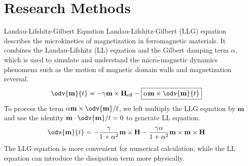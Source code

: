 \documentclass [ svgnames,aspectratio = 2013, handout ] {beamer}
\begin{document}
\maketitle

\section{Research Methods}

\begin{frame}{Landau-Lifshitz-Gilbert Equation}
  \pause
  Landau-Lifshitz-Gilbert (LLG) equation describes the microkinetics of magnetization in ferromagnetic materials. It combines the Landau-Lifshitz (LL) equation and the Gilbert damping term $\alpha$, which is used to simulate and understand the micro-magnetic dynamics phenomena such as the motion of magnetic domain walls and magnetization reversal.
  \pause
  \begin{equation}
    \odv{\mathbf m}{t} = -\gamma \mathbf m \times \mathbf H_\text{eff} -
    \boxed{\alpha \mathbf m \times \odv{\mathbf m}{t}}
  \end{equation}
  \pause
  To process the term $\alpha \mathbf m \times \odv{\mathbf m}/{t}$,
  we left multiply the LLG equation by $\mathbf m$ and use the identity
  $\mathbf m \cdot \odv{\mathbf m}/{t} = 0$ to generate LL equation.
  \pause
  \begin{equation}
    \odv{\mathbf m}{t} = -\frac{\gamma}{1 + \alpha^2} \mathbf m \times \mathbf H - \frac{\gamma\alpha}{1 + \alpha^2} \mathbf m \times \mathbf m \times \mathbf H
  \end{equation}
  \pause
  \alert{The LLG equation is more convenient for numerical calculation, while the LL equation can introduce the dissipation term more physically.}
\end{frame}
\end{document}
